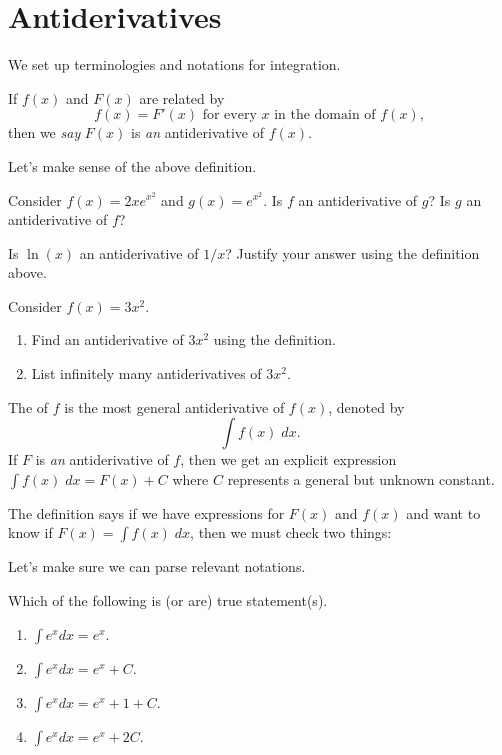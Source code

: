 \documentclass[../main.tex]{subfiles}
\begin{document}
 \section{Antiderivatives}
We set up terminologies and notations for integration.

\begin{mdframed}[style=withref-compact]
  If \(f(x)\) and \(F(x)\) are related by
  \[
    f(x) = F'(x) \text{ for every } x \text{ in the domain of } f(x),
  \]
  then we \emph{say} \(F(x)\) is \emph{an} antiderivative of \(f(x)\).
\end{mdframed}

Let's make sense of the above definition.
\begin{example}
  Consider \(f(x) = 2xe^{x^{2}}\) and \(g(x) = e^{x^{2}}\). Is \(f\) an antiderivative of \(g\)? Is \(g\) an antiderivative of \(f\)?
\end{example}

\begin{example}
  Is \(\ln(x)\) an antiderivative of \(1/x\)? Justify your answer using the definition above.

\end{example}

\begin{example}
  Consider \(f(x) = 3x^{2}\).

  \begin{enumerate}
    \item Find an antiderivative of \(3x^{2}\) using the definition.
    \item List infinitely many antiderivatives of \(3x^{2}\).
  \end{enumerate}
\end{example}
\clearpage

\begin{mdframed}[style=withref-compact]
  The  of \(f\) is the most general antiderivative of \(f(x)\), denoted by 
  \[
    \int f(x) \;dx.
  \]
  If \(F\) is \emph{an} antiderivative of \(f\), then we get an explicit expression \(\int f(x) \;dx = F(x) + C\) where \(C\) represents a general but unknown constant.

\end{mdframed}
The definition says if we have expressions for \(F(x)\) and \(f(x)\) and want to know if \(F(x) = \int f(x) \;dx\), then we must check two things:

Let's make sure we can parse relevant notations. 
\begin{example}
  Which of the following is (or are) true statement(s).
  \begin{enumerate}[label=(\alph*)]
    \item \(\int e^{x} dx = e^{x}\).
    \item \(\int e^{x} dx = e^{x} + C\).
    \item \(\int e^{x} dx = e^{x} + 1 + C\).
    \item \(\int e^{x} dx = e^{x} + 2C\).
  \end{enumerate}
\end{example}
\end{document}
